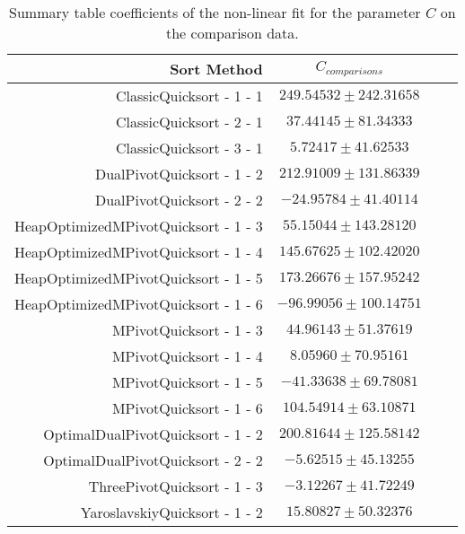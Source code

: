 		\begin{table}
			\begin{center}
				\begin{tabular}{|r|c|c|c}
					\hline
									Sort Method              &   $C_{comparisons}$      \\ \hline \hline
		                ClassicQuicksort - 1 - 1 &  $ 249.54532 \pm 242.31658$ \\ \hline
		                ClassicQuicksort - 2 - 1 &  $  37.44145 \pm  81.34333$ \\ \hline
		                ClassicQuicksort - 3 - 1 &  $   5.72417 \pm  41.62533$ \\ \hline
		              DualPivotQuicksort - 1 - 2 &  $ 212.91009 \pm 131.86339$ \\ \hline
		              DualPivotQuicksort - 2 - 2 &  $ -24.95784 \pm  41.40114$ \\ \hline
		    HeapOptimizedMPivotQuicksort - 1 - 3 &  $  55.15044 \pm 143.28120$ \\ \hline
		    HeapOptimizedMPivotQuicksort - 1 - 4 &  $ 145.67625 \pm 102.42020$ \\ \hline
		    HeapOptimizedMPivotQuicksort - 1 - 5 &  $ 173.26676 \pm 157.95242$ \\ \hline
		    HeapOptimizedMPivotQuicksort - 1 - 6 &  $ -96.99056 \pm 100.14751$ \\ \hline
		                 MPivotQuicksort - 1 - 3 &  $  44.96143 \pm  51.37619$ \\ \hline
		                 MPivotQuicksort - 1 - 4 &  $   8.05960 \pm  70.95161$ \\ \hline
		                 MPivotQuicksort - 1 - 5 &  $ -41.33638 \pm  69.78081$ \\ \hline
		                 MPivotQuicksort - 1 - 6 &  $ 104.54914 \pm  63.10871$ \\ \hline
		       OptimalDualPivotQuicksort - 1 - 2 &  $ 200.81644 \pm 125.58142$ \\ \hline
		       OptimalDualPivotQuicksort - 2 - 2 &  $  -5.62515 \pm  45.13255$ \\ \hline
		             ThreePivotQuicksort - 1 - 3 &  $  -3.12267 \pm  41.72249$ \\ \hline
		           YaroslavskiyQuicksort - 1 - 2 &  $  15.80827 \pm  50.32376$ \\ \hline
				\end{tabular}
				\caption{Summary table coefficients of the non-linear fit for the parameter $C$ on the comparison data.}
				\label{tab:compFitCoeffC}
			\end{center}
		\end{table}




